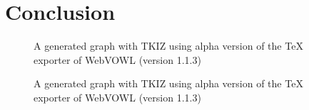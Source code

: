 \section{Conclusion}



% 
% 

\begin{figure}[H]
	\caption{A generated graph with TKIZ using alpha version of the TeX exporter of WebVOWL (version 1.1.3) } 
\end{figure} 

\begin{figure}[H]
	\caption{A generated graph with TKIZ using alpha version of the TeX exporter of WebVOWL (version 1.1.3) } 
\end{figure} 